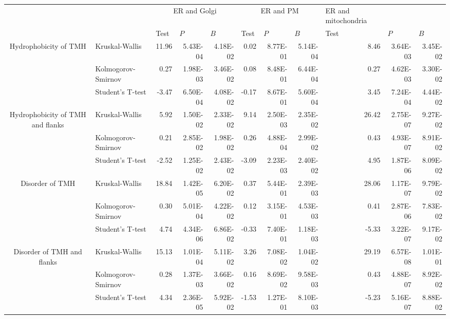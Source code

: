 \begin{table}[htbp]
	\begin{tabular}{clrrrrrrrrr}
							&       & \multicolumn{3}{c}{ER and Golgi} & \multicolumn{3}{c}{ER and PM} & \multicolumn{1}{l}{ER and mitochondria} &       &  \\
							&       & \multicolumn{1}{l}{ Test} & \multicolumn{1}{l}{ $P$} & \multicolumn{1}{l}{ $B$} & \multicolumn{1}{l}{ Test} & \multicolumn{1}{l}{ $P$} & \multicolumn{1}{l}{ $B$} & \multicolumn{1}{l}{ Test} & \multicolumn{1}{l}{ $P$} & \multicolumn{1}{l}{ $B$} \\
	\multirow{3}[0]{*}{Hydrophobicity of TMH } &  Kruskal-Wallis & 11.96 & 5.43E-04 & 4.18E-02 & 0.02  & 8.77E-01 & 5.14E-04 & 8.46  & 3.64E-03 & 3.45E-02 \\
							&  Kolmogorov-Smirnov & 0.27  & 1.98E-03 & 3.46E-02 & 0.08  & 8.48E-01 & 6.44E-04 & 0.27  & 4.62E-03 & 3.30E-02 \\
							&  Student's T-test & -3.47 & 6.50E-04 & 4.08E-02 & -0.17 & 8.67E-01 & 5.60E-04 & 3.45  & 7.24E-04 & 4.44E-02 \\
	\multirow{3}[0]{*}{Hydrophobicity of TMH and flanks } &  Kruskal-Wallis & 5.92  & 1.50E-02 & 2.33E-02 & 9.14  & 2.50E-03 & 2.35E-02 & 26.42 & 2.75E-07 & 9.27E-02 \\
							&  Kolmogorov-Smirnov & 0.21  & 2.85E-02 & 1.98E-02 & 0.26  & 4.88E-04 & 2.99E-02 & 0.43  & 4.93E-07 & 8.91E-02 \\
							&  Student's T-test & -2.52 & 1.25E-02 & 2.43E-02 & -3.09 & 2.23E-03 & 2.40E-02 & 4.95  & 1.87E-06 & 8.09E-02 \\
	\multirow{3}[0]{*}{Disorder of TMH } &  Kruskal-Wallis & 18.84 & 1.42E-05 & 6.20E-02 & 0.37  & 5.44E-01 & 2.39E-03 & 28.06 & 1.17E-07 & 9.79E-02 \\
							&  Kolmogorov-Smirnov & 0.30  & 5.01E-04 & 4.22E-02 & 0.12  & 3.15E-01 & 4.53E-03 & 0.41  & 2.87E-06 & 7.83E-02 \\
							&  Student's T-test & 4.74  & 4.34E-06 & 6.86E-02 & -0.33 & 7.40E-01 & 1.18E-03 & -5.33 & 3.22E-07 & 9.17E-02 \\
	\multirow{3}[0]{*}{Disorder of TMH and flanks } &  Kruskal-Wallis & 15.13 & 1.01E-04 & 5.11E-02 & 3.26  & 7.08E-02 & 1.04E-02 & 29.19 & 6.57E-08 & 1.01E-01 \\
							&  Kolmogorov-Smirnov & 0.28  & 1.37E-03 & 3.66E-02 & 0.16  & 8.69E-02 & 9.58E-03 & 0.43  & 4.88E-07 & 8.92E-02 \\
							&  Student's T-test & 4.34  & 2.36E-05 & 5.92E-02 & -1.53 & 1.27E-01 & 8.10E-03 & -5.23 & 5.16E-07 & 8.88E-02 \\

\end{tabular}
\end{table}
